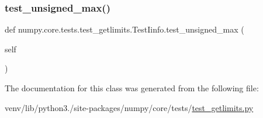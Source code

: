 \subsubsection{\texorpdfstring{test\+\_\+unsigned\+\_\+max()}{test\_unsigned\_max()}}
{\footnotesize\ttfamily def numpy.\+core.\+tests.\+test\+\_\+getlimits.\+Test\+Iinfo.\+test\+\_\+unsigned\+\_\+max (\begin{DoxyParamCaption}\item[{}]{self }\end{DoxyParamCaption})}



The documentation for this class was generated from the following file\+:\begin{DoxyCompactItemize}
\item 
venv/lib/python3./site-\/packages/numpy/core/tests/\hyperlink{test__getlimits_8py}{test\+\_\+getlimits.\+py}\end{DoxyCompactItemize}

